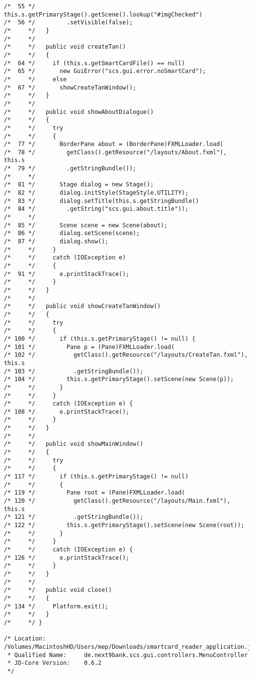 \begin{lstlisting}
/*  55 */       this.s.getPrimaryStage().getScene().lookup("#imgChecked")
/*  56 */         .setVisible(false);
/*     */   }
/*     */ 
/*     */   public void createTan()
/*     */   {
/*  64 */     if (this.s.getSmartCardFile() == null)
/*  65 */       new GuiError("scs.gui.error.noSmartCard");
/*     */     else
/*  67 */       showCreateTanWindow();
/*     */   }
/*     */ 
/*     */   public void showAboutDialogue()
/*     */   {
/*     */     try
/*     */     {
/*  77 */       BorderPane about = (BorderPane)FXMLLoader.load(
/*  78 */         getClass().getResource("/layouts/About.fxml"), this.s
/*  79 */         .getStringBundle());
/*     */ 
/*  81 */       Stage dialog = new Stage();
/*  82 */       dialog.initStyle(StageStyle.UTILITY);
/*  83 */       dialog.setTitle(this.s.getStringBundle()
/*  84 */         .getString("scs.gui.about.title"));
/*     */ 
/*  85 */       Scene scene = new Scene(about);
/*  86 */       dialog.setScene(scene);
/*  87 */       dialog.show();
/*     */     }
/*     */     catch (IOException e)
/*     */     {
/*  91 */       e.printStackTrace();
/*     */     }
/*     */   }
/*     */ 
/*     */   public void showCreateTanWindow()
/*     */   {
/*     */     try
/*     */     {
/* 100 */       if (this.s.getPrimaryStage() != null) {
/* 101 */         Pane p = (Pane)FXMLLoader.load(
/* 102 */           getClass().getResource("/layouts/CreateTan.fxml"), this.s
/* 103 */           .getStringBundle());
/* 104 */         this.s.getPrimaryStage().setScene(new Scene(p));
/*     */       }
/*     */     }
/*     */     catch (IOException e) {
/* 108 */       e.printStackTrace();
/*     */     }
/*     */   }
/*     */ 
/*     */   public void showMainWindow()
/*     */   {
/*     */     try
/*     */     {
/* 117 */       if (this.s.getPrimaryStage() != null)
/*     */       {
/* 119 */         Pane root = (Pane)FXMLLoader.load(
/* 120 */           getClass().getResource("/layouts/Main.fxml"), this.s
/* 121 */           .getStringBundle());
/* 122 */         this.s.getPrimaryStage().setScene(new Scene(root));
/*     */       }
/*     */     }
/*     */     catch (IOException e) {
/* 126 */       e.printStackTrace();
/*     */     }
/*     */   }
/*     */ 
/*     */   public void close()
/*     */   {
/* 134 */     Platform.exit();
/*     */   }
/*     */ }

/* Location:           /Volumes/MacintoshHD/Users/mep/Downloads/smartcard_reader_application.jar
 * Qualified Name:     de.next9bank.scs.gui.controllers.MenuController
 * JD-Core Version:    0.6.2
 */
\end{lstlisting}


